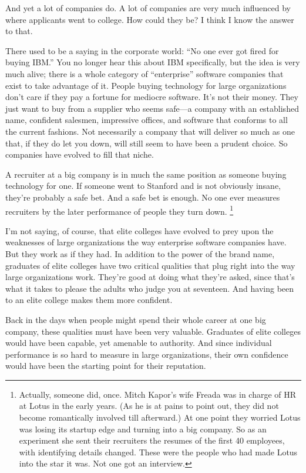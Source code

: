 \documentclass[12pt]{book}
\begin{document}
And yet a lot of companies do. A lot of companies are very much
influenced by where applicants went to college. How could they be? I
think I know the answer to that.

There used to be a saying in the corporate world: ``No one ever got
fired for buying IBM.'' You no longer hear this about IBM specifically,
but the idea is very much alive; there is a whole category of
``enterprise'' software companies that exist to take advantage of it.
People buying technology for large organizations don't care if they pay
a fortune for mediocre software. It's not their money. They just want to
buy from a supplier who seems safe---a company with an established name,
confident salesmen, impressive offices, and software that conforms to
all the current fashions. Not necessarily a company that will deliver so
much as one that, if they do let you down, will still seem to have been
a prudent choice. So companies have evolved to fill that niche.

A recruiter at a big company is in much the same position as someone
buying technology for one. If someone went to Stanford and is not
obviously insane, they're probably a safe bet. And a safe bet is enough.
No one ever measures recruiters by the later performance of people they
turn down. \footnote{Actually, someone did, once. Mitch Kapor's wife Freada was in
charge of HR at Lotus in the early years. (As he is at pains to point
out, they did not become romantically involved till afterward.) At one
point they worried Lotus was losing its startup edge and turning into a
big company. So as an experiment she sent their recruiters the resumes
of the first 40 employees, with identifying details changed. These were
the people who had made Lotus into the star it was. Not one got an
interview.}

I'm not saying, of course, that elite colleges have evolved to prey upon
the weaknesses of large organizations the way enterprise software
companies have. But they work as if they had. In addition to the power
of the brand name, graduates of elite colleges have two critical
qualities that plug right into the way large organizations work. They're
good at doing what they're asked, since that's what it takes to please
the adults who judge you at seventeen. And having been to an elite
college makes them more confident.

Back in the days when people might spend their whole career at one big
company, these qualities must have been very valuable. Graduates of
elite colleges would have been capable, yet amenable to authority. And
since individual performance is so hard to measure in large
organizations, their own confidence would have been the starting point
for their reputation.
\end{document}
